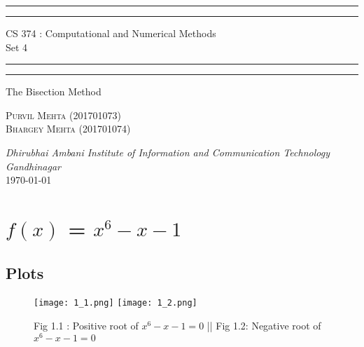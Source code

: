 \documentclass{article}
\begin{document}
\begin{titlepage}
	\centering 
	\scshape
	\vspace*{\baselineskip}
	\rule{\textwidth}{1.6pt}\vspace*{-\baselineskip}\vspace*{2pt}
	\rule{\textwidth}{0.4pt} 
	\vspace{0.75\baselineskip}
	
	{\Large CS 374 : Computational and Numerical Methods \\\vspace{0.75\baselineskip} Set 4}
	\vspace{0.75\baselineskip}
	
	\rule{\textwidth}{0.4pt}\vspace*{-\baselineskip}\vspace{3.2pt} 
	\rule{\textwidth}{1.6pt}
	
	\vspace{2\baselineskip}  
	The Bisection Method
	
	\vspace*{3\baselineskip}
	
	\vspace{0.5\baselineskip} %
	
	{\scshape\large Purvil Mehta (201701073) \\ Bhargey Mehta (201701074) \\} 
	
	\vspace{1\baselineskip} 
	
	\textit{Dhirubhai Ambani Institute of Information and Communication Technology \\ Gandhinagar\\} 
	\vspace*{2\baselineskip}
	\today


\end{titlepage}


\newpage
\tableofcontents
\newpage

\section{$f(x)$ = $x^6 - x - 1$}

\subsection{Plots}
\begin{figure}[!h]
    \centering
    \texttt{[image: 1\_1.png]}
    \texttt{[image: 1\_2.png]}
    \caption{Fig 1.1 : Positive root of $x^6 - x -1 = 0$ 
     || Fig 1.2: Negative root of $x^6 - x -1 = 0$}
\end{figure}
\end{document}
